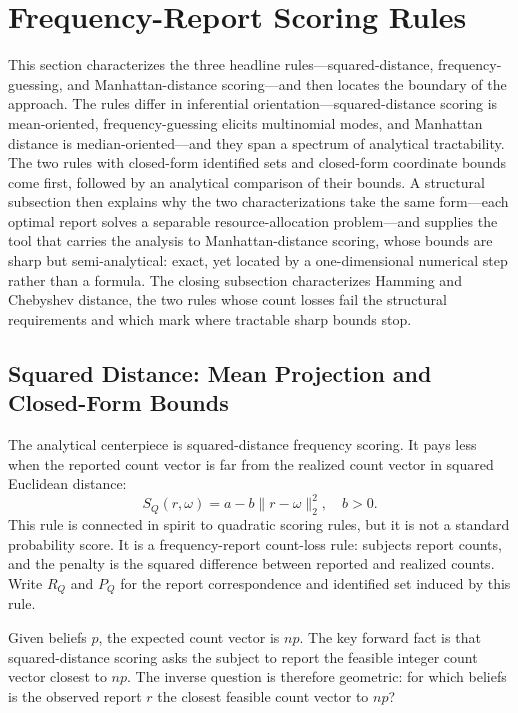 \section{Frequency-Report Scoring Rules}

This section characterizes the three headline rules---squared-distance, frequency-guessing, and Manhattan-distance scoring---and then locates the boundary of the approach.
The rules differ in inferential orientation---squared-distance scoring is mean-oriented, frequency-guessing elicits multinomial modes, and Manhattan distance is median-oriented---and they span a spectrum of analytical tractability.
The two rules with closed-form identified sets and closed-form coordinate bounds come first, followed by an analytical comparison of their bounds.
A structural subsection then explains why the two characterizations take the same form---each optimal report solves a separable resource-allocation problem---and supplies the tool that carries the analysis to Manhattan-distance scoring, whose bounds are sharp but semi-analytical: exact, yet located by a one-dimensional numerical step rather than a formula.
The closing subsection characterizes Hamming and Chebyshev distance, the two rules whose count losses fail the structural requirements and which mark where tractable sharp bounds stop.

\subsection{Squared Distance: Mean Projection and Closed-Form Bounds}

The analytical centerpiece is squared-distance frequency scoring.
It pays less when the reported count vector is far from the realized count vector in squared Euclidean distance:
\[
S_Q(r,\omega)=a-b\|r-\omega\|_2^2,
\quad b>0.
\]
This rule is connected in spirit to quadratic scoring rules, but it is not a standard probability score.
It is a frequency-report count-loss rule: subjects report counts, and the penalty is the squared difference between reported and realized counts.
Write \(R_Q\) and \(P_Q\) for the report correspondence and identified set induced by this rule.

Given beliefs \(p\), the expected count vector is \(np\).
The key forward fact is that squared-distance scoring asks the subject to report the feasible integer count vector closest to \(np\).
The inverse question is therefore geometric: for which beliefs is the observed report \(r\) the closest feasible count vector to \(np\)?

